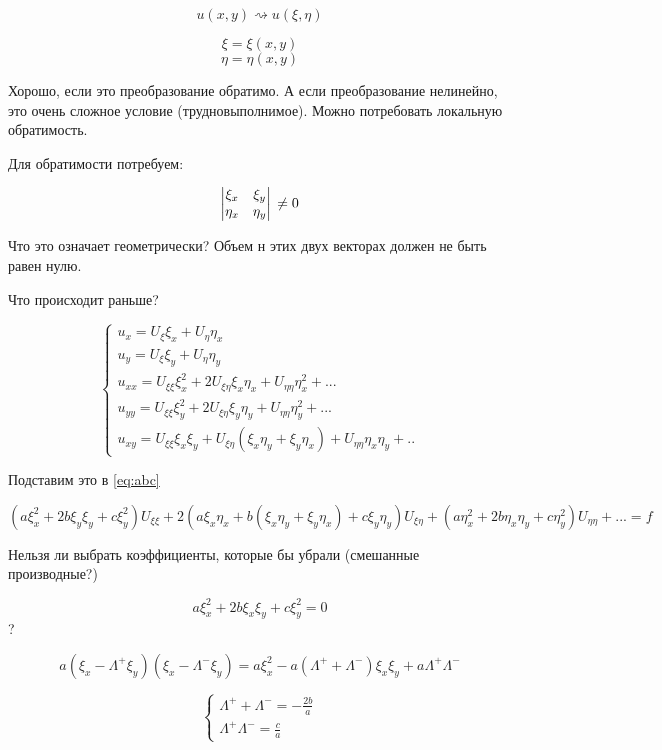 \documentclass[12pt]{report}
\begin{document}
$$u(x, y) \rightsquigarrow u(\xi, \eta)$$

$$\xi = \xi(x, y)$$
$$\eta = \eta(x, y)$$

Хорошо, если это преобразование обратимо. А если преобразование нелинейно, это очень сложное условие (трудновыполнимое). Можно потребовать локальную обратимость. 

Для обратимости потребуем: 

\[
    \begin{vmatrix}
        \xi_x & \xi_y
        \\
        \eta_x & \eta_y
    \end{vmatrix}
    \\
    \neq 0
\]

Что это означает геометрически? Объем н этих двух векторах должен не быть равен нулю. 

Что происходит раньше? 

\[
    \begin{cases}
        u_x = U_\xi \xi_x + U_\eta \eta_x
        \\
        u_y = U_\xi \xi_y + U_\eta \eta_y
        \\
        u_{xx} = U_{\xi \xi} \xi_x^2 + 2 U_{\xi \eta} \xi_x \eta_x + U_{\eta \eta} \eta_x^2 + ...
        \\
        u_{yy} = U_{\xi \xi} \xi_y^2 + 2 U_{\xi \eta} \xi_y \eta_y + U_{\eta \eta} \eta_y^2 + ...
        \\
        u_{xy} = U_{\xi \xi} \xi_x \xi_y + U_{\xi \eta} (\xi_x \eta_y + \xi_y \eta_x) + U_{\eta \eta} \eta_x \eta_y + ..
    \end{cases}
\]

Подставим это в \eqref{eq:abc}

$$(a \xi^2_x + 2b\xi_y \xi_y + c\xi^2_y)U_{\xi \xi} + 2(a \xi_x \eta_x + b(\xi_x \eta_y + \xi_y \eta_x) + c \xi_y \eta_y) U_{\xi \eta} + (a \eta^2_x + 2b \eta_x \eta_y + c \eta^2_y) U_{\eta \eta} + ... = f$$

Нельзя ли выбрать коэффициенты, которые бы убрали (смешанные производные?)

$$a \xi^2_x + 2b \xi_x \xi_y + c \xi^2_y = 0$$?

$$a(\xi_x - \Lambda ^ + \xi_y) (\xi_x - \Lambda ^ - \xi_y) = a \xi^2_x - a(\Lambda^+ + \Lambda^-) \xi_x \xi_y + a \Lambda^+ \Lambda^-$$

\[
    \begin{cases}
        \Lambda^+ + \Lambda^- = - \frac{2b}{a}
        \\
        \Lambda^+ \Lambda^- = \frac{c}{a}
    \end{cases}
\]
\end{document}
